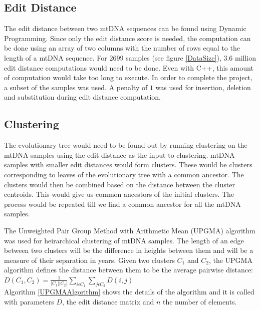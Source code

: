 \documentclass[conference]{IEEEtran}
\begin{document}
\subsection{Edit Distance}
The edit distance between two mtDNA sequences can be found using Dynamic Programming. Since only the edit distance score is needed, the computation can be done using an array of two columns with the number of rows equal to the length of a mtDNA sequence. For 2699 samples (see figure \ref{DataSize}), 3.6 million edit distance computations would need to be done. Even with C++, this amount of computation would take too long to execute. In order to complete the project, a subset of the samples was used. A penalty of $1$ was used for insertion, deletion and substitution during edit distance computation.

\FloatBarrier
\subsection{Clustering}
The evolutionary tree would need to be found out by running clustering on the mtDNA samples using the edit distance as the input to clustering. mtDNA samples with smaller edit distances would form clusters. These would be clusters corresponding to leaves of the evolutionary tree with a common ancestor. The clusters would then be combined based on the distance between the cluster centroids. This would give us common ancestors of the initial clusters. The process would be repeated till we find a common ancestor for all the mtDNA samples. 

The Unweighted Pair Group Method with Arithmetic Mean (UPGMA) algorithm \cite{TextBook1} was used for heirarchical clustering of mtDNA samples. The length of an edge between two clusters will be the difference in heights between them and will be a measure of their separation in years. Given two clusters $C_1$ and $C_2$, the UPGMA algorithm defines the distance between them to be the average pairwise distance: \\

$D(C_1, C_2) =\frac{1}{\left | C_1 \right | \left | C_2 \right |} \sum_{i \epsilon C_1} \sum_{j \epsilon C_2} D\left (i, j \right )$\\

Algorithm \ref{UPGMAAlgorithm} shows the details of the algorithm and it is called with parameters $D$, the edit distance matrix and $n$ the number of elements.
\end{document}
